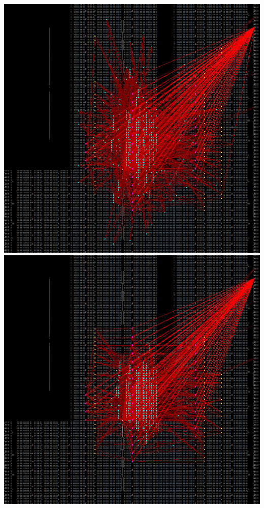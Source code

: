{    \includegraphics[valign=t, scale=0.13]{figures/results/PlacerAnnealRandom/00000100.png}
    \includegraphics[valign=t, scale=0.13]{figures/results/PlacerAnnealRandom/00000299.png}
    \label{fig:PARSnapshots}
}


